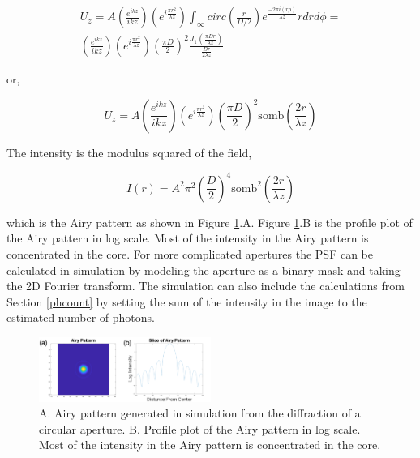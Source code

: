 
\begin{eqnarray}
   U_z=A\left(\frac{e^{ikz}}{ikz}\right)\left(e^{i\frac{\pi r^2}{\lambda z}}\right)\int_{\infty} circ\left(\frac{r}{D/2}\right)e^{\frac{-2\pi i (r \rho )}{\lambda z}}rdrd\phi= \\
   \left(\frac{e^{ikz}}{ikz}\right)\left(e^{i\frac{\pi r^2}{\lambda z}}\right) {\left(\frac{\pi D}{2}\right)}^2 \frac{J_1 (\frac{\pi Dr}{\lambda z})}{\frac{Dr}{2\lambda z}} \nonumber
\end{eqnarray}

\noindent or,

\begin{equation}
    U_z=A \left(\frac{e^{ikz}}{ikz}\right)\left(e^{i\frac{\pi r^2}{\lambda z}}\right) {\left(\frac{\pi D}{2}\right)}^2 \text{somb}\left(\frac{2r}{\lambda z}\right)
\end{equation} 

\noindent The intensity is the modulus squared of the field,

\begin{equation}
    I(r)=A^2 {\pi^2\left(\frac{D}{2}\right)}^4 \text{somb}^2\left(\frac{2r}{\lambda z}\right)
\end{equation}

\noindent which is the Airy pattern as shown in Figure \ref{fig:Airy}.A. Figure \ref{fig:Airy}.B is the profile plot of the Airy pattern in log scale. Most of the intensity in the Airy pattern is concentrated in the core. For more complicated apertures the PSF can be calculated in simulation by modeling the aperture as a binary mask and taking the 2D Fourier transform. The simulation can also include the calculations from Section \ref{phcount} by setting the sum of the intensity in the image to the estimated number of photons.

\begin{figure}
    \centering
    \includegraphics[width=0.5\textwidth]{Chapter Materials/Chapter Two Materials/airypatterns.png}
    \caption{A. Airy pattern generated in simulation from the diffraction of a circular aperture. B. Profile plot of the Airy pattern in log scale. Most of the intensity in the Airy pattern is concentrated in the core.}
    \label{fig:Airy}
\end{figure}


